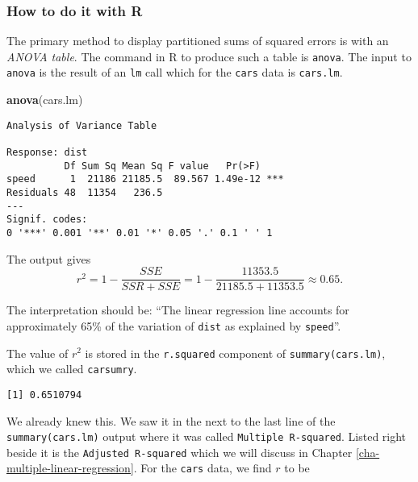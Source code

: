 \documentclass[]{book}
\newenvironment{Shaded}{\begin{snugshade}}{\end{snugshade}}
\newcommand{\KeywordTok}[1]{\textcolor[rgb]{0.13,0.29,0.53}{\textbf{{#1}}}}
\newcommand{\NormalTok}[1]{{#1}}
\numberwithin{equation}{chapter}
\numberwithin{figure}{chapter}
\theoremstyle{plain}
\theoremstyle{definition}
\theoremstyle{remark}
\theoremstyle{definition}
\theoremstyle{definition}
\theoremstyle{remark}
\begin{document}
\subsubsection{How to do it with R}\label{how-to-do-it-with-r-45}

The primary method to display partitioned sums of squared errors is with
an \emph{ANOVA table}. The command in R to produce such a table is
\texttt{anova}. The input to \texttt{anova} is the result of an
\texttt{lm} call which for the \texttt{cars} data is \texttt{cars.lm}.

\begin{Shaded}
\begin{Highlighting}[]
\KeywordTok{anova}\NormalTok{(cars.lm)}
\end{Highlighting}
\end{Shaded}

\begin{verbatim}
Analysis of Variance Table

Response: dist
          Df Sum Sq Mean Sq F value   Pr(>F)    
speed      1  21186 21185.5  89.567 1.49e-12 ***
Residuals 48  11354   236.5                     
---
Signif. codes:  
0 '***' 0.001 '**' 0.01 '*' 0.05 '.' 0.1 ' ' 1
\end{verbatim}

The output gives \[
r^{2}=1-\frac{SSE}{SSR+SSE}=1-\frac{11353.5}{21185.5+11353.5}\approx0.65.
\]

The interpretation should be: ``The linear regression line accounts for
approximately 65\% of the variation of \texttt{dist} as explained by
\texttt{speed}''.

The value of \(r^{2}\) is stored in the \texttt{r.squared} component of
\texttt{summary(cars.lm)}, which we called \texttt{carsumry}.

\begin{Shaded}
\end{Shaded}

\begin{verbatim}
[1] 0.6510794
\end{verbatim}

We already knew this. We saw it in the next to the last line of the
\texttt{summary(cars.lm)} output where it was called
\texttt{Multiple\ R-squared}. Listed right beside it is the
\texttt{Adjusted\ R-squared} which we will discuss in Chapter
\ref{cha-multiple-linear-regression}. For the \texttt{cars} data, we
find \(r\) to be
\end{document}
